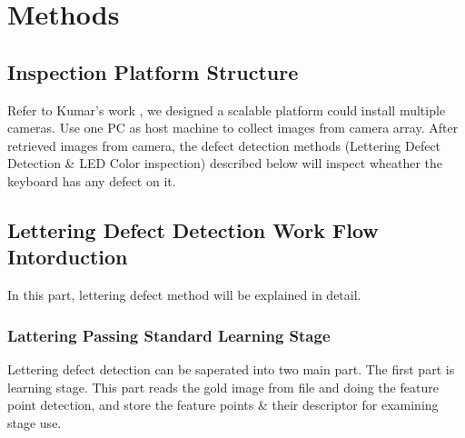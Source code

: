 \chapter{Methods}
\label{c:methods}

\section{Inspection Platform Structure}
Refer to Kumar's work \cite{kumar2008computer}, we designed a scalable platform could install multiple cameras. Use one PC as host machine to collect images from camera array.
After retrieved images from camera, the defect detection methods (Lettering Defect Detection \& LED Color inspection) described below will inspect wheather the keyboard has any defect on it. 

\section{Lettering Defect Detection Work Flow Intorduction}
\label{letteringDetection}
	In this part, lettering defect method will be explained in detail.
	\subsection{Lattering Passing Standard Learning Stage} 
		Lettering defect detection can be saperated into two main part.
		The first part is learning stage. This part reads the gold image from file and doing the feature point detection, and store the feature points \& their descriptor for examining stage use.


